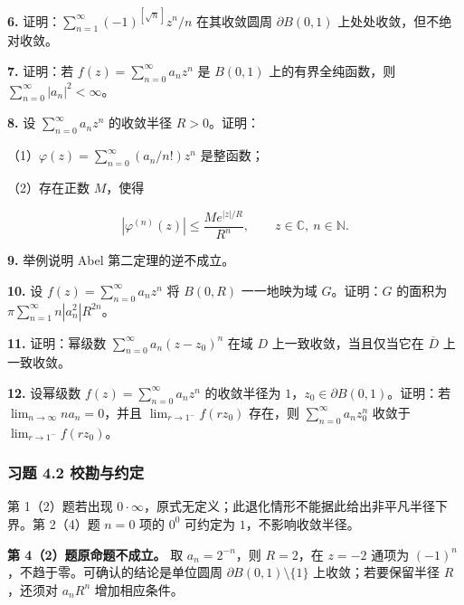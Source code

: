 \documentclass[11pt,a4paper]{article}
\begin{document}
\par{}
\noindent\textbf{6.} 证明：\(\sum_{n=1}^{\infty}(-1)^{[\sqrt n]}z^n/n\)
在其收敛圆周 \(\partial B(0,1)\) 上处处收敛，但不绝对收敛。

\par{}
\noindent\textbf{7.} 证明：若 \(f(z)=\sum_{n=0}^{\infty}a_nz^n\) 是 \(B(0,1)\)
上的有界全纯函数，则 \(\sum_{n=0}^{\infty}|a_n|^2<\infty\)。

\par{}
\noindent\textbf{8.} 设 \(\sum_{n=0}^{\infty}a_nz^n\) 的收敛半径 \(R>0\)。证明：

（1）\(\varphi(z)=\sum_{n=0}^{\infty}(a_n/n!)z^n\) 是整函数；

（2）存在正数 \(M\)，使得

\[
|\varphi^{(n)}(z)|\le\frac{Me^{|z|/R}}{R^n},\qquad z\in\mathbb C,\ n\in\mathbb N.
\]

\par{}
\noindent\textbf{9.} 举例说明 Abel 第二定理的逆不成立。

\par{}
\noindent\textbf{10.} 设 \(f(z)=\sum_{n=0}^{\infty}a_nz^n\) 将 \(B(0,R)\)
一一地映为域 \(G\)。证明：\(G\) 的面积为
\(\pi\sum_{n=1}^{\infty}n|a_n^2|R^{2n}\)。

\par{}
\noindent\textbf{11.} 证明：幂级数 \(\sum_{n=0}^{\infty}a_n(z-z_0)^n\) 在域 \(D\)
上一致收敛，当且仅当它在 \(\overline D\) 上一致收敛。

\par{}
\noindent\textbf{12.} 设幂级数 \(f(z)=\sum_{n=0}^{\infty}a_nz^n\) 的收敛半径为
\(1\)，\(z_0\in\partial B(0,1)\)。证明：若
\(\lim_{n\to\infty}na_n=0\)，并且 \(\lim_{r\to1^-}f(rz_0)\) 存在，则
\(\sum_{n=0}^{\infty}a_nz_0^n\) 收敛于 \(\lim_{r\to1^-}f(rz_0)\)。

\subsubsection{习题 4.2
校勘与约定}\label{ch04-practice-ux4e60ux9898-42-ux6821ux52d8ux4e0eux7ea6ux5b9a}

第 1（2）题若出现
\(0\cdot\infty\)，原式无定义；此退化情形不能据此给出非平凡半径下界。第
2（4）题 \(n=0\) 项的 \(0^0\) 可约定为 \(1\)，不影响收敛半径。

\textbf{第 4（2）题原命题不成立。} 取 \(a_n=2^{-n}\)，则 \(R=2\)，在
\(z=-2\) 通项为 \((-1)^n\)，不趋于零。可确认的结论是单位圆周
\(\partial B(0,1)\setminus\{1\}\) 上收敛；若要保留半径 \(R\)，还须对
\(a_nR^n\) 增加相应条件。
\end{document}
